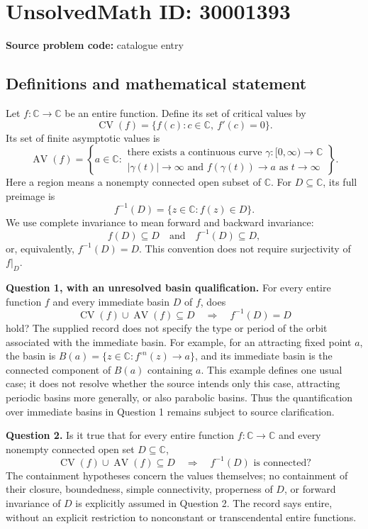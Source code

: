 \documentclass[11pt]{article}
\newcommand{\C}{\mathbb{C}}
\begin{document}
\section*{UnsolvedMath ID: 30001393}
\textbf{Source problem code:} catalogue entry
\subsection{Definitions and mathematical statement}
Let \(f\colon\C\to\C\) be an entire function. Define its set of critical values by
\[
\operatorname{CV}(f)=\{f(c):c\in\C,\ f'(c)=0\}.
\]
Its set of finite asymptotic values is
\[
\operatorname{AV}(f)=\left\{a\in\C:\begin{array}{l}\text{there exists a continuous curve }\gamma\colon[0,\infty)\to\C\\ |\gamma(t)|\to\infty\text{ and }f(\gamma(t))\to a\text{ as }t\to\infty\end{array}\right\}.
\]
Here a region means a nonempty connected open subset of \(\C\). For \(D\subseteq\C\), its full preimage is
\[
f^{-1}(D)=\{z\in\C:f(z)\in D\}.
\]
We use complete invariance to mean forward and backward invariance:
\[
f(D)\subseteq D\quad\text{and}\quad f^{-1}(D)\subseteq D,
\]
or, equivalently, \(f^{-1}(D)=D\). This convention does not require surjectivity of \(f|_D\).

\textbf{Question 1, with an unresolved basin qualification.} For every entire function \(f\) and every immediate basin \(D\) of \(f\), does
\[
\operatorname{CV}(f)\cup\operatorname{AV}(f)\subseteq D
\quad\Longrightarrow\quad f^{-1}(D)=D
\]
hold? The supplied record does not specify the type or period of the orbit associated with the immediate basin. For example, for an attracting fixed point \(a\), the basin is \(B(a)=\{z\in\C:f^{\circ n}(z)\to a\}\), and its immediate basin is the connected component of \(B(a)\) containing \(a\). This example defines one usual case; it does not resolve whether the source intends only this case, attracting periodic basins more generally, or also parabolic basins. Thus the quantification over immediate basins in Question 1 remains subject to source clarification.

\textbf{Question 2.} Is it true that for every entire function \(f\colon\C\to\C\) and every nonempty connected open set \(D\subseteq\C\),
\[
\operatorname{CV}(f)\cup\operatorname{AV}(f)\subseteq D
\quad\Longrightarrow\quad f^{-1}(D)\text{ is connected}?
\]
The containment hypotheses concern the values themselves; no containment of their closure, boundedness, simple connectivity, properness of \(D\), or forward invariance of \(D\) is explicitly assumed in Question 2. The record says entire, without an explicit restriction to nonconstant or transcendental entire functions.
\end{document}
